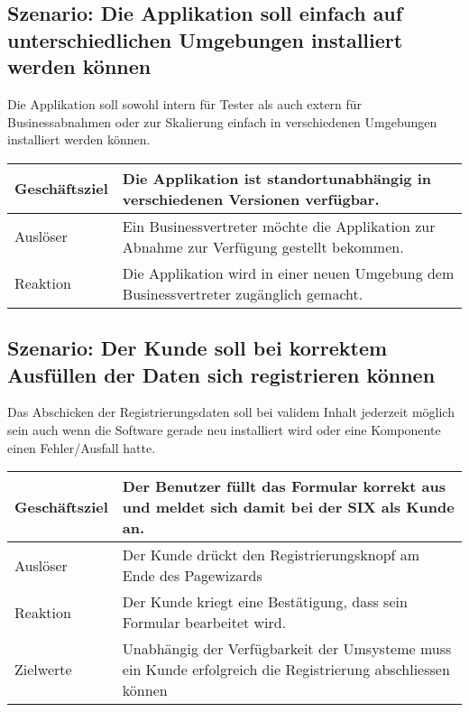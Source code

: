\subsection{Szenario: Die Applikation soll einfach auf unterschiedlichen Umgebungen installiert werden können}

Die Applikation soll sowohl intern für Tester als auch extern für Businessabnahmen oder zur Skalierung einfach in verschiedenen Umgebungen installiert werden können.

\begin{table}[H]
	\centering
	\begin{tabular}{ | p{3cm} | p{11cm} | }
		\toprule
		Geschäftsziel & Die Applikation ist standortunabhängig in verschiedenen Versionen verfügbar. \\ \hline
		Auslöser & Ein Businessvertreter möchte die Applikation zur Abnahme zur Verfügung gestellt bekommen. \\ \hline
		Reaktion & Die Applikation wird in einer neuen Umgebung dem Businessvertreter zugänglich gemacht. \\
		\bottomrule
	\end{tabular}
\end{table}

\subsection{Szenario: Der \Gls{Kunde} soll bei korrektem Ausfüllen der Daten sich registrieren können}

Das Abschicken der Registrierungsdaten soll bei validem Inhalt jederzeit möglich sein auch wenn die Software gerade neu installiert wird oder eine Komponente einen Fehler/Ausfall hatte.

\begin{table}[H]
	\centering
	\begin{tabular}{ | p{3cm} | p{11cm} | }
		\toprule
		Geschäftsziel & Der Benutzer füllt das Formular korrekt aus und meldet sich damit bei der SIX als Kunde an. \\ \hline
		Auslöser & Der Kunde drückt den Registrierungsknopf am Ende des Pagewizards \\  \hline
		Reaktion & Der Kunde kriegt eine Bestätigung, dass sein Formular bearbeitet wird. \\ \hline
		Zielwerte & Unabhängig der Verfügbarkeit der Umsysteme muss ein Kunde erfolgreich die Registrierung abschliessen können \\
		\bottomrule
	\end{tabular}
\end{table}

